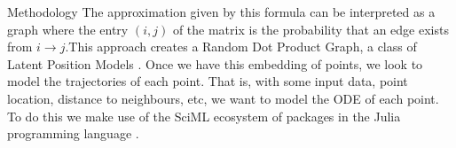 \documentclass{article}
\begin{document}
\begin{section}{Methodology}
    The approximation  given by this formula can be interpreted as a graph where the entry $(i,j)$ of the matrix is the probability that an edge exists from $i \rightarrow j$.This approach creates a Random Dot Product Graph\cite{athreya2017statistical}, a class of Latent Position Models \cite{hoff2002latent}. Once we have this embedding of points, we look to model the trajectories of each point. That is, with some input data, point location, distance to neighbours, etc, we want to model the ODE of each point. To do this we make use of the SciML ecosystem of packages in the Julia programming language \cite{SciML_C_Rak}.\\



     
    

\end{section}
\end{document}
